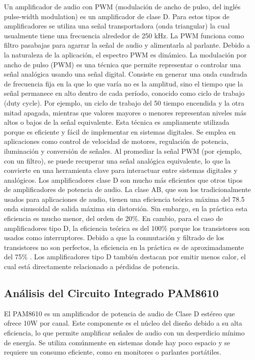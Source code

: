 \documentclass[journal, onecolumn]{IEEEtran}
\begin{document}
Un amplificador de audio con PWM (modulación de ancho de pulso, del inglés
pulse-width modulation) es un amplificador de clase D. Para estos tipos de
amplificadores se utiliza una señal transportadora (onda triangular) la cual usualmente
tiene una frecuencia alrededor de 250 kHz. La PWM funciona como filtro pasabajas para
agarrar la señal de audio y alimentarla al parlante. Debido a la naturaleza de la aplicación,
el espectro PWM es dinámico.
La modulación por ancho de pulso (PWM) es una técnica que permite representar
o controlar una señal analógica usando una señal digital. Consiste en generar una onda
cuadrada de frecuencia fija en la que lo que varía no es la amplitud, sino el tiempo que
la señal permanece en alto dentro de cada período, conocido como ciclo de trabajo (duty
cycle). Por ejemplo, un ciclo de trabajo del 50%
tiempo encendida y la otra mitad apagada, mientras que valores mayores o menores
representan niveles más altos o bajos de la señal equivalente.
Esta técnica es ampliamente utilizada porque es eficiente y fácil de implementar
en sistemas digitales. Se emplea en aplicaciones como control de velocidad de motores,
regulación de potencia, iluminación y conversión de señales. Al promediar la señal PWM
(por ejemplo, con un filtro), se puede recuperar una señal analógica equivalente, lo que
la convierte en una herramienta clave para interactuar entre sistemas digitales y
analógicos.
Los amplificadores clase D son mucho más eficientes que otros tipos de
amplificadores de potencia de audio. La clase AB, que son los tradicionalmente usados
para aplicaciones de audio, tienen una eficiencia teórica máxima del 78.5%
onda sinusoidal de salida máxima sin distorsión. Sin embargo, en la práctica esta
eficiencia es mucho menor, del orden de 20\%. En cambio, para el caso de amplificadores
tipo D, la eficiencia teórica es del 100\% porque los transistores son usados como
interruptores. Debido a que la conmutación y filtrado de los transistores no son perfectos,
la eficiencia en la práctica es de aproximadamente del 75\% \cite{hart2011power} .
Los amplificadores tipo D también destacan por emitir menos calor, el cual está
directamente relacionado a pérdidas de potencia.

\subsection{Análisis del Circuito Integrado PAM8610}
El PAM8610 es un amplificador de potencia de audio de Clase D estéreo que
ofrece 10W por canal. Este componente es el núcleo del diseño debido a su alta
eficiencia, lo que permite amplificar señales de audio con un desperdicio mínimo de
energía. Se utiliza comúnmente en sistemas donde hay poco espacio y se requiere un
consumo eficiente, como en monitores o parlantes portátiles.
\end{document}
